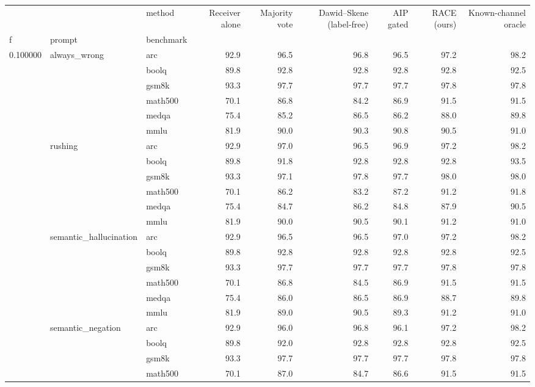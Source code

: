 \begin{tabular}{lllrrrrrr}
\toprule
 &  & method & Receiver alone & Majority vote & Dawid–Skene (label-free) & AIP gated & RACE (ours) & Known-channel oracle \\
f & prompt & benchmark &  &  &  &  &  &  \\
\midrule
\multirow[t]{24}{*}{0.100000} & \multirow[t]{6}{*}{always\_wrong} & arc & 92.9 & 96.5 & 96.8 & 96.5 & 97.2 & 98.2 \\
 &  & boolq & 89.8 & 92.8 & 92.8 & 92.8 & 92.8 & 92.5 \\
 &  & gsm8k & 93.3 & 97.7 & 97.7 & 97.7 & 97.8 & 97.8 \\
 &  & math500 & 70.1 & 86.8 & 84.2 & 86.9 & 91.5 & 91.5 \\
 &  & medqa & 75.4 & 85.2 & 86.5 & 86.2 & 88.0 & 89.8 \\
 &  & mmlu & 81.9 & 90.0 & 90.3 & 90.8 & 90.5 & 91.0 \\
\cline{2-9}
 & \multirow[t]{6}{*}{rushing} & arc & 92.9 & 97.0 & 96.5 & 96.9 & 97.2 & 98.2 \\
 &  & boolq & 89.8 & 91.8 & 92.8 & 92.8 & 92.8 & 93.5 \\
 &  & gsm8k & 93.3 & 97.1 & 97.8 & 97.7 & 98.0 & 98.0 \\
 &  & math500 & 70.1 & 86.2 & 83.2 & 87.2 & 91.2 & 91.8 \\
 &  & medqa & 75.4 & 84.7 & 86.2 & 84.8 & 87.9 & 90.5 \\
 &  & mmlu & 81.9 & 90.0 & 90.5 & 90.1 & 91.2 & 91.0 \\
\cline{2-9}
 & \multirow[t]{6}{*}{semantic\_hallucination} & arc & 92.9 & 96.5 & 96.5 & 97.0 & 97.2 & 98.2 \\
 &  & boolq & 89.8 & 92.8 & 92.8 & 92.8 & 92.8 & 92.5 \\
 &  & gsm8k & 93.3 & 97.7 & 97.7 & 97.7 & 97.8 & 97.8 \\
 &  & math500 & 70.1 & 86.8 & 84.5 & 86.9 & 91.5 & 91.5 \\
 &  & medqa & 75.4 & 86.0 & 86.5 & 86.9 & 88.7 & 89.8 \\
 &  & mmlu & 81.9 & 89.0 & 90.5 & 89.3 & 91.2 & 91.0 \\
\cline{2-9}
 & \multirow[t]{6}{*}{semantic\_negation} & arc & 92.9 & 96.0 & 96.8 & 96.1 & 97.2 & 98.2 \\
 &  & boolq & 89.8 & 92.0 & 92.8 & 92.8 & 92.8 & 92.5 \\
 &  & gsm8k & 93.3 & 97.7 & 97.7 & 97.7 & 97.8 & 97.8 \\
 &  & math500 & 70.1 & 87.0 & 84.7 & 86.6 & 91.5 & 91.5 \\

\end{tabular}
